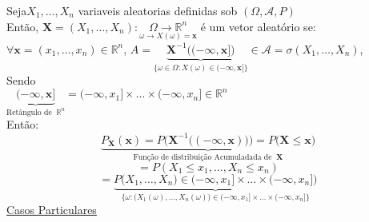 \documentclass[a4paper,12pt]{article}
\begin{document}
Seja$ X_1,\ldots,X_n$ variaveis aleatorias definidas sob $(\Omega,\mathscr{A},P)$\\
Então, $\bm X=(X_1,\ldots,X_n): \underset{\omega \longrightarrow X(\omega)=\bm x}{\Omega\longrightarrow \mathbb R^n}$ é um vetor aleatório se:\\
$\forall \bm x = (x_1,\ldots,x_n) \in \mathbb R^n$, $A = \underbrace{\bm X^{-1}\bigg((-\infty,\bm x]\bigg)}_{ \{\omega \in \Omega: X(\omega)\in (-\infty,\bm x]\}}
 \in \mathscr A = \sigma(X_1,\ldots,X_n)$,
 \\
 Sendo \\
 $\underbrace{(-\infty,\bm x]}_{\text{Retângulo de } \ \mathbb R^n} = (-\infty, x_1]\times \ldots \times (-\infty,x_n]\in \mathbb R^n $\\
 Então:\\
 $$\underbrace{P_{\bm X}(\bm x) = P\bigg(\bm X^{-1}\bigg((-\infty,\bm x)\bigg)\bigg)= P\bigg(\bm X\le \bm x\bigg)}_
 {\text{Função de distribuição Acumuladada de } \ \bm X}$$
$$=P(X_1\le x_1,\ldots, X_n\le x_n) $$
$$= \underbrace{P\bigg (X_1,\ldots,X_n)\in  (-\infty, x_1]\times \ldots \times (-\infty,x_n]\bigg)}_
{\bigg\{\omega:\bigg(X_1(\omega),\ldots,X_n(\omega)\bigg)\in (-\infty,x_1]\times\ldots\times(-\infty,x_n] \bigg\}} $$
\underline{Casos Particulares}\\
\\
\end{document}
